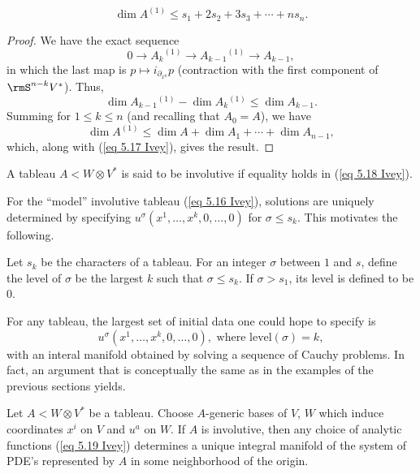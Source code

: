 \begin{prop}
    \[\dim A^{(1)}\leq s_1+2s_2+3s_3+\cdots +ns_n. \label{eq 5.18 Ivey}\]
\end{prop}
\begin{proof}
    We have the exact sequence 
    \[0\to A_k{}^{(1)}\to A_{k-1}{}^{(1)}\to A_{k-1},\]
    in which the last map is $p\mapsto i_{\partial_{x^k}}p$ (contraction with the first component of $\rmS^{n-k}V^\ast$). Thus, 
    \[\dim A_{k-1}{}^{(1)}-\dim A_k{}^{(1)}\leq \dim A_{k-1}.\]   
    Summing for $1\leq k\leq n$ (and recalling that $A_0=A$), we have 
    \[\dim A^{(1)}\leq \dim A+\dim A_1+\cdots +\dim A_{n-1},\]
    which, along with (\ref{eq 5.17 Ivey}), gives the result.
\end{proof}
\begin{defn}
    A tableau $A<W\otimes V^\ast$ is said to be involutive if equality holds in (\ref{eq 5.18 Ivey}).
\end{defn}


For the ``model'' involutive tableau (\ref{eq 5.16 Ivey}), solutions are uniquely determined by specifying $u^\sigma(x^1,\ldots,x^k,0,\ldots,0)$ for $\sigma\leq s_k$. This motivates the following.

\begin{defn}[Level]
    Let $s_k$ be the characters of a tableau. For an integer $\sigma$ between $1$ and $s$, define the level of $\sigma$ be the largest $k$ such that $\sigma\leq s_k$. If $\sigma>s_1$, its level is defined to be $0$.
\end{defn}

For any tableau, the largest set of initial data one could hope to specify is 
\[u^\sigma(x^1,\ldots,x^k,0,\ldots,0),\text{ where }\mathrm{level}(\sigma)=k,\label{eq 5.19 Ivey}\]
with an interal manifold obtained by solving a sequence of Cauchy problems. In fact, an argument that is conceptually the same as in the examples of the previous sections yields.

\begin{thm}\label{thm 5.5.7 Ivey}
    Let $A<W\otimes V^\ast$ be a tableau. Choose $A$-generic bases of $V$, $W$ which induce coordinates $x^i$ on $V$ and $u^a$ on $W$. If $A$ is involutive, then any choice of analytic functions (\ref{eq 5.19 Ivey}) determines a unique integral manifold of the system of PDE's represented by $A$ in some neighborhood of the origin.
\end{thm}

